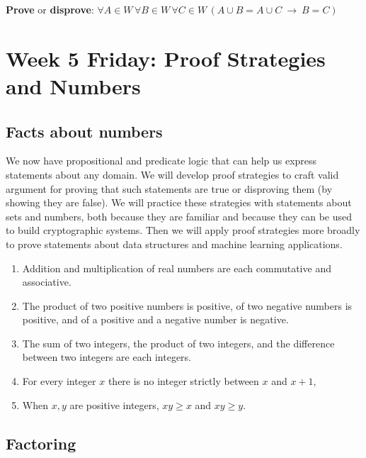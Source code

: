 \documentclass[12pt, oneside]{article}
\begin{document}
\vfill
\vfill

{\bf Prove} or {\bf  disprove}:  $\forall  A \in W\,  \forall B \in W\, \forall C  \in W\,  \left( A\cup B  = A \cup  C
~\to ~ B = C \right)$

\vfill
\vfill \newpage
\section*{Week 5 Friday: Proof Strategies and Numbers}

\subsection*{Facts about numbers}


We now have propositional and predicate logic that can help us express 
statements about any domain. We will develop proof strategies to 
craft valid argument for proving that such statements are true or disproving
them (by showing they are false). We will practice these strategies with 
statements about sets and numbers, both because they are familiar and because they
can be used to build cryptographic systems. Then we will apply proof strategies
more broadly to prove statements about data structures and machine learning 
applications. 

\begin{enumerate}
    \item Addition and multiplication of real 
    numbers are each commutative and associative. 
    \vspace{25pt}
    \item The product of two positive numbers is positive, of 
    two negative numbers is positive, and of a positive and a negative number is negative.
    \vspace{25pt}
    \item The sum of two integers, the product of two integers, and the 
    difference between two integers are each integers.
    \vspace{25pt}
    \item For every integer $x$ there is no integer strictly between $x$ and $x+1$, 
    \vspace{25pt}
    \item When $x, y$ are positive integers, $xy \geq x$ and $xy \geq y$.
    \vspace{25pt}
\end{enumerate}
 \subsection*{Factoring}
\end{document}
